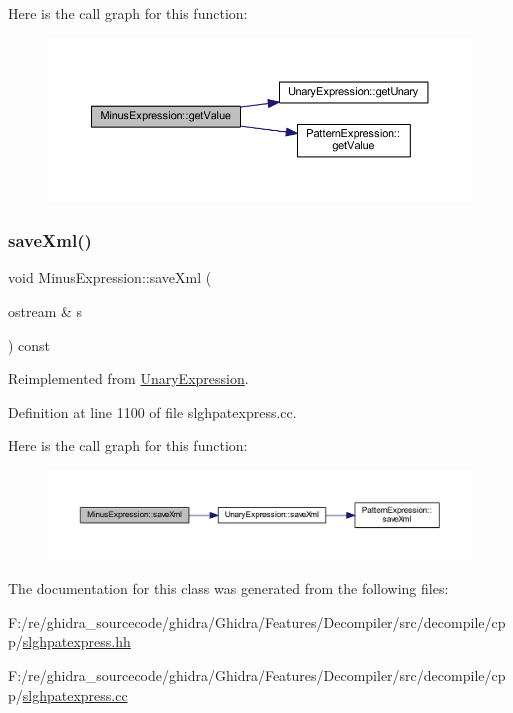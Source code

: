 Here is the call graph for this function\+:
\nopagebreak
\begin{figure}[H]
\begin{center}
\leavevmode
\includegraphics[width=350pt]{class_minus_expression_a70ffca1486be90676a669b34e9b3b6be_cgraph}
\end{center}
\end{figure}
\mbox{\label{class_minus_expression_a3edf1546b4d4161e68ed8151654a9b9b}} 
\subsubsection{\texorpdfstring{saveXml()}{saveXml()}}
{\footnotesize\ttfamily void Minus\+Expression\+::save\+Xml (\begin{DoxyParamCaption}\item[{ostream \&}]{s }\end{DoxyParamCaption}) const\hspace{0.3cm}{\ttfamily [virtual]}}



Reimplemented from \mbox{\hyperlink{class_unary_expression_a8b6b833f511d84b606baf8233d271255}{Unary\+Expression}}.



Definition at line 1100 of file slghpatexpress.\+cc.

Here is the call graph for this function\+:
\nopagebreak
\begin{figure}[H]
\begin{center}
\leavevmode
\includegraphics[width=350pt]{class_minus_expression_a3edf1546b4d4161e68ed8151654a9b9b_cgraph}
\end{center}
\end{figure}


The documentation for this class was generated from the following files\+:\begin{DoxyCompactItemize}
\item 
F\+:/re/ghidra\+\_\+sourcecode/ghidra/\+Ghidra/\+Features/\+Decompiler/src/decompile/cpp/\mbox{\hyperlink{slghpatexpress_8hh}{slghpatexpress.\+hh}}\item 
F\+:/re/ghidra\+\_\+sourcecode/ghidra/\+Ghidra/\+Features/\+Decompiler/src/decompile/cpp/\mbox{\hyperlink{slghpatexpress_8cc}{slghpatexpress.\+cc}}\end{DoxyCompactItemize}
